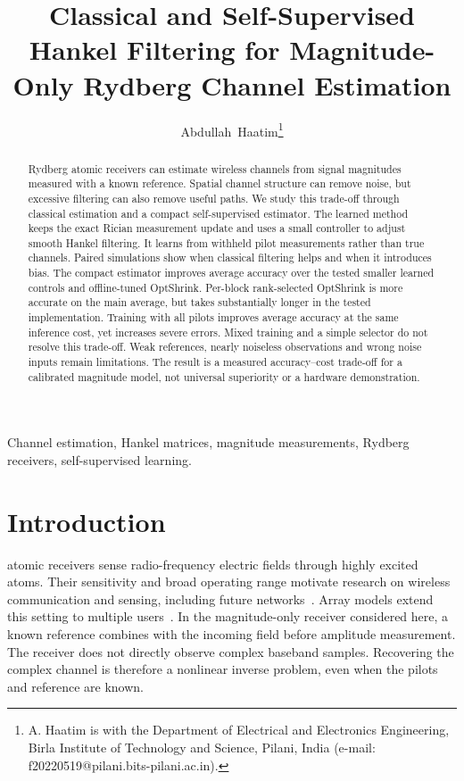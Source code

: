 \documentclass[10pt,journal,letterpaper]{IEEEtran}
\begin{document}
\title{Classical and Self-Supervised Hankel Filtering for Magnitude-Only Rydberg Channel Estimation}
\author{Abdullah~Haatim\thanks{A. Haatim is with the Department of Electrical and Electronics Engineering, Birla Institute of Technology and Science, Pilani, India (e-mail: f20220519@pilani.bits-pilani.ac.in).}}
\maketitle
\begin{abstract}
Rydberg atomic receivers can estimate wireless channels from signal magnitudes measured with a known reference. Spatial channel structure can remove noise, but excessive filtering can also remove useful paths. We study this trade-off through classical estimation and a compact self-supervised estimator. The learned method keeps the exact Rician measurement update and uses a small controller to adjust smooth Hankel filtering. It learns from withheld pilot measurements rather than true channels. Paired simulations show when classical filtering helps and when it introduces bias. The compact estimator improves average accuracy over the tested smaller learned controls and offline-tuned OptShrink. Per-block rank-selected OptShrink is more accurate on the main average, but takes substantially longer in the tested implementation. Training with all pilots improves average accuracy at the same inference cost, yet increases severe errors. Mixed training and a simple selector do not resolve this trade-off. Weak references, nearly noiseless observations and wrong noise inputs remain limitations. The result is a measured accuracy--cost trade-off for a calibrated magnitude model, not universal superiority or a hardware demonstration.
\end{abstract}
\begin{IEEEkeywords}
Channel estimation, Hankel matrices, magnitude measurements, Rydberg receivers, self-supervised learning.
\end{IEEEkeywords}

\section{Introduction}
 atomic receivers sense radio-frequency electric fields through highly excited atoms. Their sensitivity and broad operating range motivate research on wireless communication and sensing, including future networks~\cite{gong2025mag}. Array models extend this setting to multiple users~\cite{cui2025}. In the magnitude-only receiver considered here, a known reference combines with the incoming field before amplitude measurement. The receiver does not directly observe complex baseband samples. Recovering the complex channel is therefore a nonlinear inverse problem, even when the pilots and reference are known.
\end{document}
